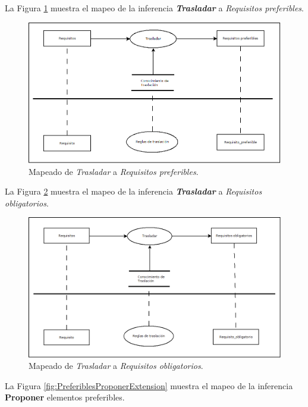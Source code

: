 La Figura \ref{fig:TrasladarPreferibles} muestra el mapeo de la inferencia \textbf{\textit{Trasladar}} a \textit{Requisitos preferibles}.

\begin{figure}[H]
  \centering
  \includegraphics[scale=0.35]{imaxes/TrasladarPreferibles.png}
  \caption{\label{fig:TrasladarPreferibles}Mapeado de \textit{Trasladar} a \textit{Requisitos preferibles}.}
\end{figure}

La Figura \ref{fig:TrasladarObligatorios} muestra el mapeo de la inferencia \textbf{\textit{Trasladar}} a \textit{Requisitos obligatorios}.

\begin{figure}[H]
  \centering
  \includegraphics[scale=0.35]{imaxes/TrasladarObligatorios.png}
  \caption{\label{fig:TrasladarObligatorios}Mapeado de \textit{Trasladar} a \textit{Requisitos obligatorios}.}
\end{figure}

La Figura \ref{fig:PreferiblesProponerExtension} muestra el mapeo de la inferencia \textbf{Proponer} elementos preferibles.

